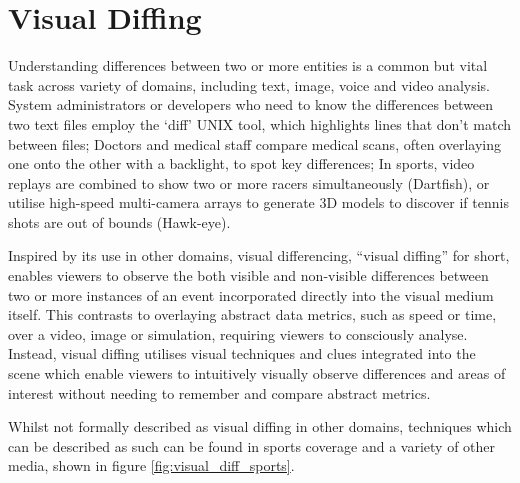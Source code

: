 \section{Visual Diffing}
\label{sec:visualDiffing}
Understanding differences between two or more entities is a common but vital task across variety of domains, including text, image, voice and video analysis. System administrators or developers who need to know the differences between two text files employ the `diff' UNIX tool\footnotemark, which highlights lines that don't match between files; Doctors and medical staff compare medical scans, often overlaying one onto the other with a backlight, to spot key differences; In sports, video replays are combined to show two or more racers simultaneously (Dartfish), or utilise high-speed multi-camera arrays to generate 3D models to discover if tennis shots are out of bounds (Hawk-eye).

Inspired by its use in other domains, visual differencing, ``visual diffing'' for short, enables viewers to observe the both visible and non-visible differences between two or more instances of an event incorporated directly into the visual medium itself. This contrasts to overlaying abstract data metrics, such as speed or time, over a video, image or simulation, requiring viewers to consciously analyse. Instead, visual diffing utilises visual techniques and clues integrated into the scene which enable viewers to intuitively visually observe differences and areas of interest without needing to remember and compare abstract metrics.

Whilst not formally described as visual diffing in other domains, techniques which can be described as such can be found in sports coverage and a variety of other media, shown in figure \ref{fig:visual_diff_sports}.

